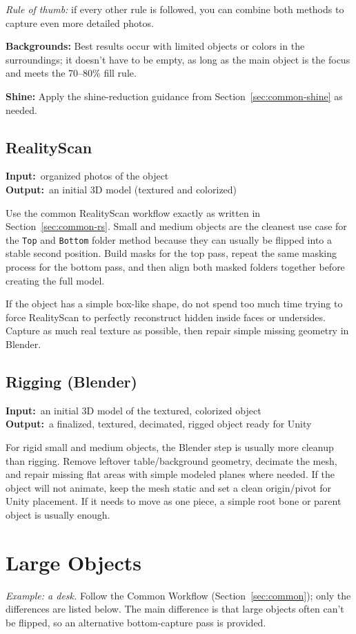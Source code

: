 \documentclass[11pt]{article}
\newcommand{\inout}[2]{%
    \begin{stageio}%
    \textbf{Input:}~#1\\[2pt]%
    \textbf{Output:}~#2%
    \end{stageio}%
}
\begin{document}
\noindent\textit{Rule of thumb:} if every other rule is followed, you can combine both methods to capture even more detailed photos.

\textbf{Backgrounds:} Best results occur with limited objects or colors in the surroundings; it doesn't have to be empty, as long as the main object is the focus and meets the 70--80\% fill rule.

\textbf{Shine:} Apply the shine-reduction guidance from Section~\ref{sec:common-shine} as needed.

\subsection{RealityScan}
\inout{organized photos of the object}{an initial 3D model (textured and colorized)}
Use the common RealityScan workflow exactly as written in Section~\ref{sec:common-rs}. Small and medium objects are the cleanest use case for the \texttt{Top} and \texttt{Bottom} folder method because they can usually be flipped into a stable second position. Build masks for the top pass, repeat the same masking process for the bottom pass, and then align both masked folders together before creating the full model.

\noindent If the object has a simple box-like shape, do not spend too much time trying to force RealityScan to perfectly reconstruct hidden inside faces or undersides. Capture as much real texture as possible, then repair simple missing geometry in Blender.

\subsection{Rigging (Blender)}
\inout{an initial 3D model of the textured, colorized object}{a finalized, textured, decimated, rigged object ready for Unity}
For rigid small and medium objects, the Blender step is usually more cleanup than rigging. Remove leftover table/background geometry, decimate the mesh, and repair missing flat areas with simple modeled planes where needed. If the object will not animate, keep the mesh static and set a clean origin/pivot for Unity placement. If it needs to move as one piece, a simple root bone or parent object is usually enough.

\section{Large Objects}
\textit{Example: a desk.} Follow the Common Workflow (Section~\ref{sec:common}); only the differences are listed below. The main difference is that large objects often can't be flipped, so an alternative bottom-capture pass is provided.
\end{document}
